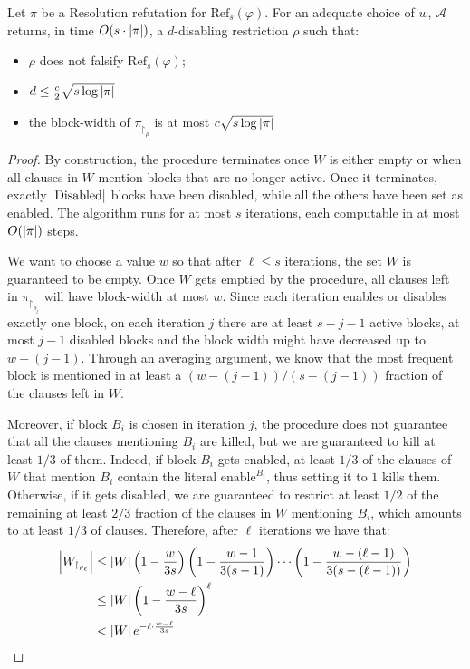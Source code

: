 \begin{lemma}
    Let $\pi$ be a Resolution refutation for $\mathrm{Ref}_s(\varphi)$. For an adequate choice of $w$,  $\mathcal{A}$ returns, in time $O(s \cdot \left|\pi\right|)$, a $d$-disabling restriction $\rho$ such that:
    \begin{itemize}[nosep]
        \item $\rho$ does not falsify $\mathrm{Ref}_s(\varphi)$;
        \item $d \leq \frac{c}{2} \sqrt{s \log\left|\pi\right|}$
        \item the block-width of $\pi_{\upharpoonright_\rho}$ is at most $c \sqrt{s \log\left|\pi\right|}$
    \end{itemize}
\end{lemma}

\begin{proof}
    By construction, the procedure terminates once $W$ is either empty or when all clauses in $W$ mention blocks that are no longer active. Once it terminates, exactly $\left|\mathrm{Disabled}\right|$ blocks have been disabled, while all the others have been set as enabled. The algorithm runs for at most $s$ iterations, each computable in at most $O(\left|\pi\right|)$ steps.

    We want to choose a value $w$ so that after $\ell \leq s$ iterations, the set $W$ is guaranteed to be empty. Once $W$ gets emptied by the procedure, all clauses left in $\pi_{{\upharpoonright_{\rho_\ell}}}$ will have block-width at most $w$. Since each iteration enables or disables exactly one block, on each iteration $j$ there are at least $s-{j-1}$ active blocks, at most $j-1$ disabled blocks and the block width might have decreased up to $w - (j - 1)$. Through an averaging argument, we know that the most frequent block is mentioned in at least a $(w-(j-1))/(s-(j-1))$ fraction of the clauses left in $W$.
    
    Moreover, if block $B_i$ is chosen in iteration $j$, the procedure does not guarantee that all the clauses mentioning $B_i$ are killed, but we are guaranteed to kill at least $1/3$ of them. Indeed, if block $B_i$ gets enabled, at least $1/3$ of the clauses of $W$ that mention $B_i$ contain the literal $\mathrm{enable}^{B_i}$, thus setting it to $1$ kills them. Otherwise, if it gets disabled, we are guaranteed to restrict at least $1/2$ of the remaining at least $2/3$ fraction of the clauses in $W$ mentioning $B_i$, which amounts to at least $1/3$ of clauses. Therefore, after $\ell$ iterations we have that:
    \begin{equation}
        \begin{split}
            \left|W_{\upharpoonright_{\rho_\ell}}\right| &\leq \left|W\right| \left ( 1 - \frac{w}{3s} \right ) \left ( 1 - \frac{w-1}{3(s-1)} \right ) \cdots \left ( 1 - \frac{w-(\ell-1)}{3(s-(\ell-1))} \right ) \\
            & \leq \left|W\right| \left ( 1 - \frac{w-\ell}{3s} \right )^{\ell} \\
            & < \left|W\right| e^{-\ell \cdot \frac{w-\ell}{3s}}
        \end{split}
    \end{equation}


\end{proof}
